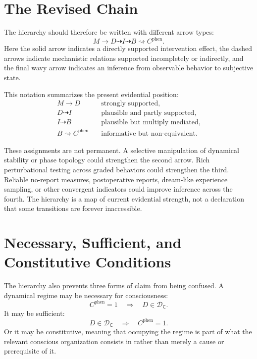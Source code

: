 \documentclass[11pt]{book}
\begin{document}
\section*{The Revised Chain}

The hierarchy should therefore be written with different arrow types:
\[
M
\longrightarrow
D
\dashrightarrow
I
\dashrightarrow
B
\rightsquigarrow
C^{\mathrm{phen}}.
\]
Here the solid arrow indicates a directly supported intervention effect, the dashed arrows indicate mechanistic relations supported incompletely or indirectly, and the final wavy arrow indicates an inference from observable behavior to subjective state.

This notation summarizes the present evidential position:
\[
\begin{aligned}
M\longrightarrow D
&\quad\text{strongly supported},\\
D\dashrightarrow I
&\quad\text{plausible and partly supported},\\
I\dashrightarrow B
&\quad\text{plausible but multiply mediated},\\
B\rightsquigarrow C^{\mathrm{phen}}
&\quad\text{informative but non-equivalent}.
\end{aligned}
\]

These assignments are not permanent. A selective manipulation of dynamical stability or phase topology could strengthen the second arrow. Rich perturbational testing across graded behaviors could strengthen the third. Reliable no-report measures, postoperative reports, dream-like experience sampling, or other convergent indicators could improve inference across the fourth. The hierarchy is a map of current evidential strength, not a declaration that some transitions are forever inaccessible.

\section*{Necessary, Sufficient, and Constitutive Conditions}

The hierarchy also prevents three forms of claim from being confused. A dynamical regime may be necessary for consciousness:
\[
C^{\mathrm{phen}}=1
\quad\Rightarrow\quad
D\in\mathcal D_{\mathsf C}.
\]
It may be sufficient:
\[
D\in\mathcal D_{\mathsf C}
\quad\Rightarrow\quad
C^{\mathrm{phen}}=1.
\]
Or it may be constitutive, meaning that occupying the regime is part of what the relevant conscious organization consists in rather than merely a cause or prerequisite of it.
\end{document}
